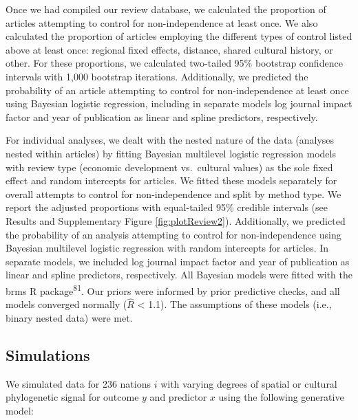 \documentclass[
  man,floatsintext]{apa6}
\begin{document}
Once we had compiled our review database, we calculated the proportion of articles attempting to control for non-independence at least once. We also calculated the proportion of articles employing the different types of control listed above at least once: regional fixed effects, distance, shared cultural history, or other. For these proportions, we calculated two-tailed 95\% bootstrap confidence intervals with 1,000 bootstrap iterations. Additionally, we predicted the probability of an article attempting to control for non-independence at least once using Bayesian logistic regression, including in separate models log journal impact factor and year of publication as linear and spline predictors, respectively.

For individual analyses, we dealt with the nested nature of the data (analyses nested within articles) by fitting Bayesian multilevel logistic regression models with review type (economic development vs.~cultural values) as the sole fixed effect and random intercepts for articles. We fitted these models separately for overall attempts to control for non-independence and split by method type. We report the adjusted proportions with equal-tailed 95\% credible intervals (see Results and Supplementary Figure \ref{fig:plotReview2}). Additionally, we predicted the probability of an analysis attempting to control for non-independence using Bayesian multilevel logistic regression with random intercepts for articles. In separate models, we included log journal impact factor and year of publication as linear and spline predictors, respectively. All Bayesian models were fitted with the brms R package\textsuperscript{81}. Our priors were informed by prior predictive checks, and all models converged normally (\(\hat{R}\) \textless{} 1.1). The assumptions of these models (i.e., binary nested data) were met.

\hypertarget{simulations}{%
\subsection{Simulations}\label{simulations}}

We simulated data for 236 nations \(i\) with varying degrees of spatial or cultural phylogenetic signal for outcome \(y\) and predictor \(x\) using the following generative model:
\end{document}
